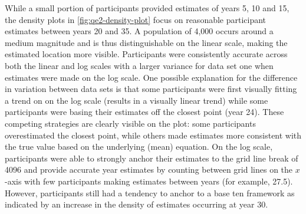 \documentclass[print]{nuthesis}
\begin{document}
While a small portion of participants provided estimates of years 5, 10 and 15, the density plots in \cref{fig:qe2-density-plot} focus on reasonable participant estimates between years 20 and 35.
A population of 4,000 occurs around a medium magnitude and is thus distinguishable on the linear scale, making the estimated location more visible.
Participants were consistently accurate across both the linear and log scales with a larger variance for data set one when estimates were made on the log scale.
One possible explanation for the difference in variation between data sets is that some participants were first visually fitting a trend on on the log scale (results in a visually linear trend) while some participants were basing their estimates off the closest point (year 24).
These competing strategies are clearly visible on the plot: some participants overestimated the closest point, while others made estimates more consistent with the true value based on the underlying (mean) equation.
On the log scale, participants were able to strongly anchor their estimates to the grid line break of 4096 and provide accurate year estimates by counting between grid lines on the \(x\)-axis with few participants making estimates between years (for example, 27.5).
However, participants still had a tendency to anchor to a base ten framework as indicated by an increase in the density of estimates occurring at year 30.
\end{document}
